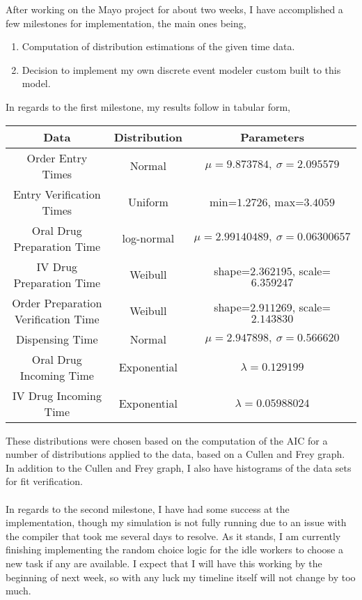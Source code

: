 \documentclass[letterpaper,10pt]{article}
\begin{document}
After working on the Mayo project for about two weeks, I have accomplished a few milestones for implementation, the main ones being,
\begin{enumerate}
\item Computation of distribution estimations of the given time data.
\item Decision to implement my own discrete event modeler custom built to this model.
\end{enumerate}
In regards to the first milestone, my results follow in tabular form,
\begin{center}
\begin{tabular}{|c|c|c|}
\hline
Data & Distribution & Parameters\\\hline
Order Entry Times & Normal & $\mu=9.873784,\ \sigma=2.095579$\\\hline
Entry Verification Times & Uniform & min=$1.2726$, max=$3.4059$\\\hline
Oral Drug Preparation Time & log-normal & $\mu=2.99140489,\ \sigma=0.06300657$\\\hline
IV Drug Preparation Time & Weibull & shape=$2.362195$, scale=$6.359247$\\\hline
Order Preparation Verification Time & Weibull & shape=$2.911269$, scale=$2.143830$\\\hline
Dispensing Time & Normal & $\mu=2.947898,\ \sigma=0.566620$\\\hline
Oral Drug Incoming Time & Exponential & $\lambda=0.129199$\\\hline
IV Drug Incoming Time & Exponential & $\lambda=0.05988024$\\\hline
\end{tabular}
\end{center}
These distributions were chosen based on the computation of the AIC for a number of distributions applied to the data, based on a Cullen and Frey graph. In addition to the Cullen and Frey graph, I also have histograms of the data sets for fit verification.\\\\
In regards to the second milestone, I have had some success at the implementation, though my simulation is not fully running due to an issue with the compiler that took me several days to resolve. As it stands, I am currently finishing implementing the random choice logic for the idle workers to choose a new task if any are available. I expect that I will have this working by the beginning of next week, so with any luck my timeline itself will not change by too much.\\
\end{document}
